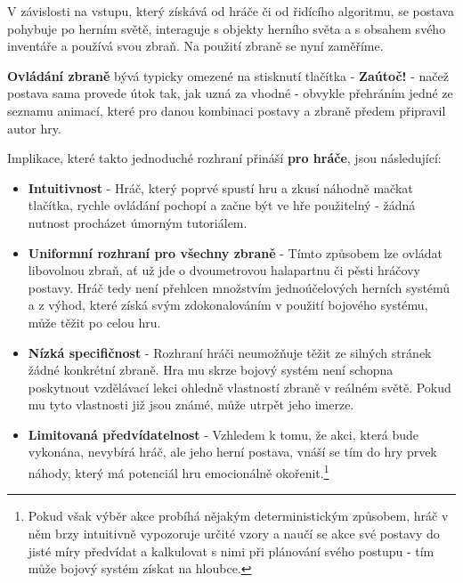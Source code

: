 V závislosti na vstupu, který získává od hráče či od řidícího algoritmu, se postava pohybuje po herním světě, interaguje s objekty herního světa a s obsahem svého inventáře a používá svou zbraň. Na použití zbraně se nyní zaměříme.

\textbf{Ovládání zbraně} bývá typicky omezené na stisknutí tlačítka - \textbf{Zaútoč!} - načež postava sama provede útok tak, jak uzná za vhodné - obvykle přehráním jedné ze seznamu animací, které pro danou kombinaci postavy a zbraně předem připravil autor hry.

Implikace, které takto jednoduché rozhraní přináší \textbf{pro hráče}, jsou následující:
\begin{itemize}
    \item \textbf{Intuitivnost} - Hráč, který poprvé spustí hru a zkusí náhodně mačkat tlačítka, rychle ovládání pochopí a začne být ve hře použitelný - žádná nutnost procházet úmorným tutoriálem.
    \item \textbf{Uniformní rozhraní pro všechny zbraně} - Tímto způsobem lze ovládat libovolnou zbraň, ať už jde o dvoumetrovou halapartnu či pěsti hráčovy postavy. Hráč tedy není přehlcen množstvím jednoúčelových herních systémů a z výhod, které získá svým zdokonalováním v použití bojového systému, může těžit po celou hru.
    \item \textbf{Nízká specifičnost} - Rozhraní hráči neumožňuje těžit ze silných stránek žádné konkrétní zbraně. Hra mu skrze bojový systém není schopna poskytnout vzdělávací lekci ohledně vlastností zbraně v reálném světě. Pokud mu tyto vlastnosti již jsou známé, může utrpět jeho imerze.
    \item \textbf{Limitovaná předvídatelnost} - Vzhledem k tomu, že akci, která bude vykonána, nevybírá hráč, ale jeho herní postava, vnáší se tím do hry prvek náhody, který má potenciál hru emocionálně okořenit.\footnote{Pokud však výběr akce probíhá nějakým deterministickým způsobem, hráč v něm brzy intuitivně vypozoruje určité vzory a naučí se akce své postavy do jisté míry předvídat a kalkulovat s nimi při plánování svého postupu - tím může bojový systém získat na hloubce.}
\end{itemize}

